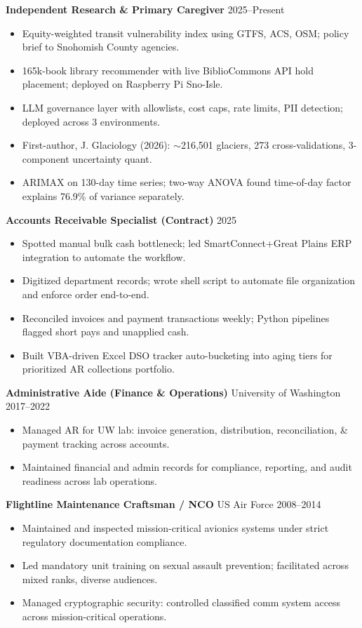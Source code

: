\documentclass[11pt,a4paper]{article}
\begin{document}
\noindent
\textbf{Independent Research \& Primary Caregiver} \hfill 2025--Present
\begin{itemize}
    \item Equity-weighted transit vulnerability index using GTFS, ACS, OSM; policy brief to Snohomish County agencies.
    \item 165k-book library recommender with live BiblioCommons API hold placement; deployed on Raspberry Pi Sno-Isle.
    \item LLM governance layer with allowlists, cost caps, rate limits, PII detection; deployed across 3 environments.
    \item First-author, J. Glaciology (2026): $\sim$216,501 glaciers, 273 cross-validations, 3-component uncertainty quant.
    \item ARIMAX on 130-day time series; two-way ANOVA found time-of-day factor explains 76.9\% of variance separately.
\end{itemize}

\vspace{0.2cm}
\noindent
\textbf{Accounts Receivable Specialist (Contract)} \hfill 2025
\begin{itemize}
    \item Spotted manual bulk cash bottleneck; led SmartConnect+Great Plains ERP integration to automate the workflow.
    \item Digitized department records; wrote shell script to automate file organization and enforce order end-to-end.
    \item Reconciled invoices and payment transactions weekly; Python pipelines flagged short pays and unapplied cash.
    \item Built VBA-driven Excel DSO tracker auto-bucketing into aging tiers for prioritized AR collections portfolio.
\end{itemize}

\vspace{0.2cm}
\noindent
\textbf{Administrative Aide (Finance \& Operations)} \hfill University of Washington \hfill 2017--2022
\begin{itemize}
    \item Managed AR for UW lab: invoice generation, distribution, reconciliation, \& payment tracking across accounts.
    \item Maintained financial and admin records for compliance, reporting, and audit readiness across lab operations.
\end{itemize}

\vspace{0.2cm}
\noindent
\textbf{Flightline Maintenance Craftsman / NCO} \hfill US Air Force \hfill 2008--2014
\begin{itemize}
    \item Maintained and inspected mission-critical avionics systems under strict regulatory documentation compliance.
    \item Led mandatory unit training on sexual assault prevention; facilitated across mixed ranks, diverse audiences.
    \item Managed cryptographic security: controlled classified comm system access across mission-critical operations.
\end{itemize}
\end{document}
